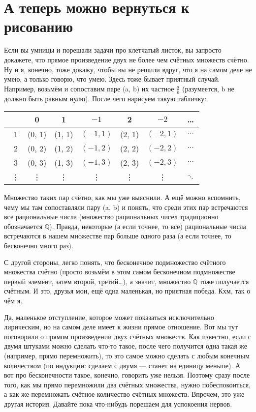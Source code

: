 \documentclass[12pt, onecolumn]{report}
\begin{document}
\section{А теперь можно вернуться к рисованию}
Если вы умницы и порешали задачи про клетчатый листок, вы запросто докажете, что прямое произведение двух не более чем счётных множеств счётно. Ну и я, конечно, тоже докажу, чтобы вы не решили вдруг, что я на самом деле не умею, а только говорю, что умею.
Здесь тоже бывает приятный случай. Например, возьмём и сопоставим паре (a, b) их частное $\frac{a}{b}$ (разумеется, b не должно быть равным нулю). После чего нарисуем такую табличку:

\begin{flushleft}
\begin{tabular}{c|cccccc}
\ & 0 & 1 &$ -1$ & 2 & $-2$ & \ldots \\
\hline
\ 1 & (0, 1) & (1, 1)& $(-1, 1)$ & (2, 1) & $(-2, 1)$ & $\cdots$ \\
\ 2 & (0, 2) & (1, 2) & $(-1, 2)$ & (2, 2) & $(-2, 2)$ & $\cdots$ \\
\ 3 & (0, 3) & (1, 3) & $(-1, 3)$ & (2, 3) & $(-2, 3)$ & $\cdots$ \\
\ \vdots & \vdots & \vdots & \vdots & \vdots & \vdots & $\ddots$ \\
\end{tabular}
\end{flushleft}

Множество таких пар счётно, как мы уже выяснили. А ещё можно вспомнить, чему мы там сопоставляли пару (a, b) и понять, что среди этих пар встречаются все рациональные числа (множество рациональных чисел традиционно обозначается $\mathbb Q$). Правда, некоторые (а если точнее, то все) рациональные числа встречаются в нашем множестве пар больше одного раза (а если точнее, то бесконечно много раз).

С другой стороны, легко понять, что бесконечное подмножество счётного множества счётно (просто возьмём в этом самом бесконечном подмножестве первый элемент, затем второй, третий\ldots ), а значит, множество $\mathbb Q$ тоже получается счётным. И это, друзья мои, ещё одна маленькая, но приятная победа. Кхм, так о чём я.

Да, маленькое отступление, которое может показаться исключительно лирическим, но на самом деле имеет к жизни прямое отношение. Вот мы тут поговорили о прямом произведении двух счётных множеств. Как известно, если с двумя штуками можно сделать что-то такое, после чего получится одна такая же (например, прямо перемножить), то это самое можно сделать с любым конечным количеством (по индукции: сделаем с двумя --- станет на единицу меньше). А вот про бесконечности такое, конечно, говорить уже нельзя. Поэтому сразу после того, как мы прямо перемножили два счётных множества, нужно побеспокоиться, а как же перемножать счётное количество счётных множеств. Впрочем, это уже другая история. Давайте пока что-нибудь порешаем для успокоения нервов.
\end{document}

